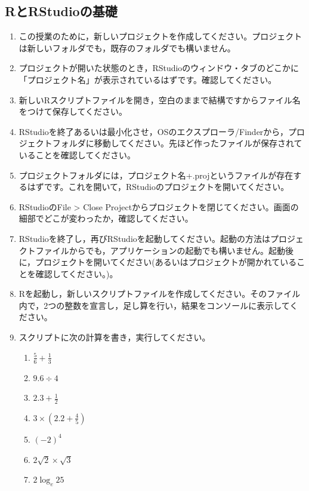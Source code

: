 \documentclass{ltjsbook}
\begin{document}
\subsection{RとRStudioの基礎}
\begin{enumerate}
	\item この授業のために，新しいプロジェクトを作成してください。プロジェクトは新しいフォルダでも，既存のフォルダでも構いません。
	\item プロジェクトが開いた状態のとき，RStudioのウィンドウ・タブのどこかに「プロジェクト名」が表示されているはずです。確認してください。
	\item 新しいRスクリプトファイルを開き，空白のままで結構ですからファイル名をつけて保存してください。
	\item RStudioを終了あるいは最小化させ，OSのエクスプローラ/Finderから，プロジェクトフォルダに移動してください。先ほど作ったファイルが保存されていることを確認してください。
	\item プロジェクトフォルダには，プロジェクト名+.projというファイルが存在するはずです。これを開いて，RStudioのプロジェクトを開いてください。
	\item RStudioのFile > Close Projectからプロジェクトを閉じてください。画面の細部でどこが変わったか，確認してください。
	\item RStudioを終了し，再びRStudioを起動してください。起動の方法はプロジェクトファイルからでも，アプリケーションの起動でも構いません。起動後に，プロジェクトを開いてください(あるいはプロジェクトが開かれていることを確認してください。)。
	\item Rを起動し，新しいスクリプトファイルを作成してください。そのファイル内で，2つの整数を宣言し，足し算を行い，結果をコンソールに表示してください。
	\item スクリプトに次の計算を書き，実行してください。
	\begin{enumerate}
		\item $\frac{5}{6} + \frac{1}{3}$
		\item $9.6 \div 4$
		\item $2.3 + \frac{1}{2}$
		\item $3\times (2.2 + \frac{4}{5})$
		\item $(-2)^4$
		\item $2\sqrt{2} \times \sqrt{3}$
		\item $2\log_e 25$
	\end{enumerate}
\end{enumerate}
\end{document}
